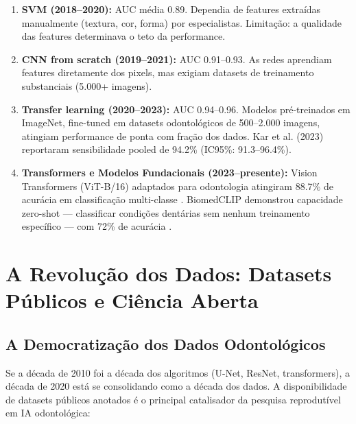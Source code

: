 \begin{enumerate}
    \item \textbf{SVM (2018--2020):} AUC média 0.89. Dependia de features extraídas manualmente (textura, cor, forma) por especialistas. Limitação: a qualidade das features determinava o teto da performance.
    \item \textbf{CNN from scratch (2019--2021):} AUC 0.91--0.93. As redes aprendiam features diretamente dos pixels, mas exigiam datasets de treinamento substanciais (5.000+ imagens).
    \item \textbf{Transfer learning (2020--2023):} AUC 0.94--0.96. Modelos pré-treinados em ImageNet, fine-tuned em datasets odontológicos de 500--2.000 imagens, atingiam performance de ponta com fração dos dados. Kar et al. (2023) \cite{ODT-010} reportaram sensibilidade pooled de 94.2\% (IC95\%: 91.3--96.4\%).
    \item \textbf{Transformers e Modelos Fundacionais (2023--presente):} Vision Transformers (ViT-B/16) adaptados para odontologia atingiram 88.7\% de acurácia em classificação multi-classe \cite{DL-ODT-012}. BiomedCLIP demonstrou capacidade zero-shot — classificar condições dentárias sem nenhum treinamento específico — com 72\% de acurácia \cite{DL-ODT-018}.
\end{enumerate}

\section{A Revolução dos Dados: Datasets Públicos e Ciência Aberta}

\subsection{A Democratização dos Dados Odontológicos}

Se a década de 2010 foi a década dos algoritmos (U-Net, ResNet, transformers), a década de 2020 está se consolidando como a década dos dados. A disponibilidade de datasets públicos anotados é o principal catalisador da pesquisa reprodutível em IA odontológica:

